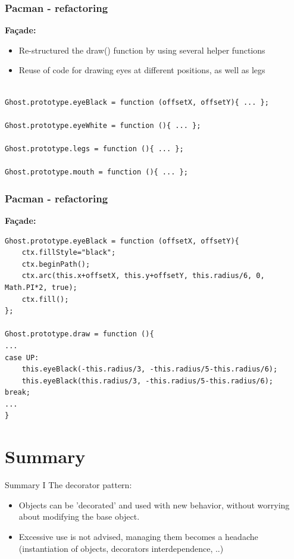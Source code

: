 \documentclass{beamer}
\begin{document}
\begin{frame}[fragile]
\frametitle{Pacman - refactoring}
\textbf{Fa\c{c}ade:}
   \begin{itemize}
    \item Re-structured the draw() function by using several helper functions
    \item Reuse of code for drawing eyes at different positions, as well as legs
    \end{itemize}
    \begin{lstlisting}
    
Ghost.prototype.eyeBlack = function (offsetX, offsetY){ ... };

Ghost.prototype.eyeWhite = function (){ ... };

Ghost.prototype.legs = function (){ ... };

Ghost.prototype.mouth = function (){ ... };

\end{lstlisting}
\end{frame}

\begin{frame}[fragile]
\frametitle{Pacman - refactoring}
\textbf{Fa\c{c}ade:}
\begin{lstlisting}
Ghost.prototype.eyeBlack = function (offsetX, offsetY){
	ctx.fillStyle="black";
	ctx.beginPath();
	ctx.arc(this.x+offsetX, this.y+offsetY, this.radius/6, 0, Math.PI*2, true); 
	ctx.fill();
};

Ghost.prototype.draw = function (){
...
case UP:
	this.eyeBlack(-this.radius/3, -this.radius/5-this.radius/6);
	this.eyeBlack(this.radius/3, -this.radius/5-this.radius/6);
break;
...
}
\end{lstlisting}
\end{frame}



\section*{Summary}
\begin{frame}{Summary I}
 The decorator pattern:
 \begin{itemize}
\item Objects can be 'decorated' and used with new behavior, without worrying about modifying the base object.
\item Excessive use is not advised, managing them becomes a headache (instantiation of objects, decorators interdependence, ..) 
 \end{itemize}
\end{frame}
\end{document}

